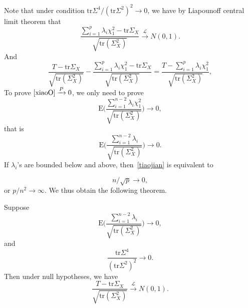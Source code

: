 Note that under condition \({\textrm{tr}\Sigma^4}/{{(\textrm{tr}\Sigma^2)}^2} \to 0\), we have by Liapounoff central limit theorem that
\[
    \frac{\sum_{i=1}^p \lambda_i \chi^2_1-\textrm{tr}\Sigma_X}{
        \sqrt{\textrm{tr}(\Sigma_X^2)}
    }\xrightarrow{\mathcal{L}}N(0,1).
    \]
And 
    \begin{equation}\label{xiaoO}
    \frac{T-\textrm{tr}\Sigma_X}{\sqrt{\textrm{tr}(\Sigma_X^2)}}-
    \frac{\sum_{i=1}^p \lambda_i \chi^2_1-\textrm{tr}\Sigma_X}{\sqrt{\textrm{tr}(\Sigma_X^2)}}
    =\frac{T-\sum_{i=1}^p \lambda_i \chi^2_1}{\sqrt{\textrm{tr}(\Sigma_X^2)}},
    \end{equation}
    To prove $\eqref{xiaoO}\xrightarrow{P}0$, we only need to prove
\[
    \textrm{E}\Big(\frac{\sum_{i=1}^{n-2} \lambda_i \chi^2_1}{
        \sqrt{\textrm{tr}(\Sigma_X^2)}}\Big)\to 0,
    \]
that is
    \begin{equation}\label{tiaojian}
    \textrm{E}\Big(\frac{\sum_{i=1}^{n-2} \lambda_i}{\sqrt{\textrm{tr}(\Sigma_X^2)}}\Big)\to 0.
    \end{equation}
If $\lambda_i$'s are bounded below and above, then~\eqref{tiaojian} is equivalent to

    \begin{equation}\label{npOrder}
        n/\sqrt{p}\to 0,
    \end{equation}
    or $p/n^2 \to \infty$. We thus obtain the following theorem.


\begin{theorem}
    Suppose
    \[
    \textrm{E}\Big(\frac{\sum_{i=1}^{n-2} \lambda_i}{\sqrt{\textrm{tr}(\Sigma_X^2)}}\Big)\to 0,
        \] 
    and
    \[
        \frac{\textrm{tr}\Sigma^4}{{(\textrm{tr}\Sigma^2)}^2} \to 0.
        \]
    Then under null hypotheses, we have
    \[
    \frac{T-\textrm{tr}\Sigma_X}{
        \sqrt{\textrm{tr}(\Sigma_X^2)}
    }\xrightarrow{\mathcal{L}}N(0,1).
        \]
\end{theorem}
